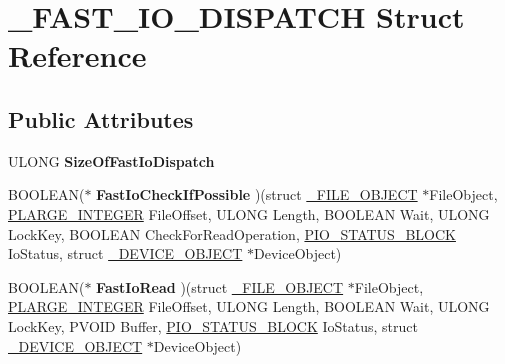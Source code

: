 \hypertarget{struct__FAST__IO__DISPATCH}{}\section{\+\_\+\+F\+A\+S\+T\+\_\+\+I\+O\+\_\+\+D\+I\+S\+P\+A\+T\+C\+H Struct Reference}
\label{struct__FAST__IO__DISPATCH}
\subsection*{Public Attributes}
\begin{DoxyCompactItemize}
\item 
\hypertarget{struct__FAST__IO__DISPATCH_a75361f9c03a5bea4af73305fd2515e07}{}U\+L\+O\+N\+G {\bfseries Size\+Of\+Fast\+Io\+Dispatch}\label{struct__FAST__IO__DISPATCH_a75361f9c03a5bea4af73305fd2515e07}

\item 
\hypertarget{struct__FAST__IO__DISPATCH_a50b495baee00b71e7539e2f890e66b00}{}B\+O\+O\+L\+E\+A\+N($\ast$ {\bfseries Fast\+Io\+Check\+If\+Possible} )(struct \hyperlink{struct__FILE__OBJECT}{\+\_\+\+F\+I\+L\+E\+\_\+\+O\+B\+J\+E\+C\+T} $\ast$File\+Object, \hyperlink{union__LARGE__INTEGER}{P\+L\+A\+R\+G\+E\+\_\+\+I\+N\+T\+E\+G\+E\+R} File\+Offset, U\+L\+O\+N\+G Length, B\+O\+O\+L\+E\+A\+N Wait, U\+L\+O\+N\+G Lock\+Key, B\+O\+O\+L\+E\+A\+N Check\+For\+Read\+Operation, \hyperlink{struct__IO__STATUS__BLOCK}{P\+I\+O\+\_\+\+S\+T\+A\+T\+U\+S\+\_\+\+B\+L\+O\+C\+K} Io\+Status, struct \hyperlink{struct__DEVICE__OBJECT}{\+\_\+\+D\+E\+V\+I\+C\+E\+\_\+\+O\+B\+J\+E\+C\+T} $\ast$Device\+Object)\label{struct__FAST__IO__DISPATCH_a50b495baee00b71e7539e2f890e66b00}

\item 
\hypertarget{struct__FAST__IO__DISPATCH_ad436097eec82a3abdebab68fa97156b0}{}B\+O\+O\+L\+E\+A\+N($\ast$ {\bfseries Fast\+Io\+Read} )(struct \hyperlink{struct__FILE__OBJECT}{\+\_\+\+F\+I\+L\+E\+\_\+\+O\+B\+J\+E\+C\+T} $\ast$File\+Object, \hyperlink{union__LARGE__INTEGER}{P\+L\+A\+R\+G\+E\+\_\+\+I\+N\+T\+E\+G\+E\+R} File\+Offset, U\+L\+O\+N\+G Length, B\+O\+O\+L\+E\+A\+N Wait, U\+L\+O\+N\+G Lock\+Key, P\+V\+O\+I\+D Buffer, \hyperlink{struct__IO__STATUS__BLOCK}{P\+I\+O\+\_\+\+S\+T\+A\+T\+U\+S\+\_\+\+B\+L\+O\+C\+K} Io\+Status, struct \hyperlink{struct__DEVICE__OBJECT}{\+\_\+\+D\+E\+V\+I\+C\+E\+\_\+\+O\+B\+J\+E\+C\+T} $\ast$Device\+Object)\label{struct__FAST__IO__DISPATCH_ad436097eec82a3abdebab68fa97156b0}


\end{DoxyCompactItemize}
